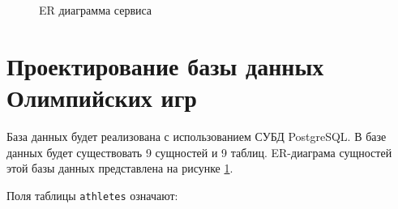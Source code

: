 \begin{figure}[!h]
	\caption{ER диаграмма сервиса}
	\label{fig:ER-App}
\end{figure}


\newpage
\section{Проектирование базы данных Олимпийских игр}

База данных будет реализована с использованием СУБД PostgreSQL. В базе данных будет существовать 9 сущностей и 9 таблиц. ER-диаграма сущностей этой базы данных представлена на рисунке \ref{fig:ER-App}.

Поля таблицы \texttt{athletes} означают:

